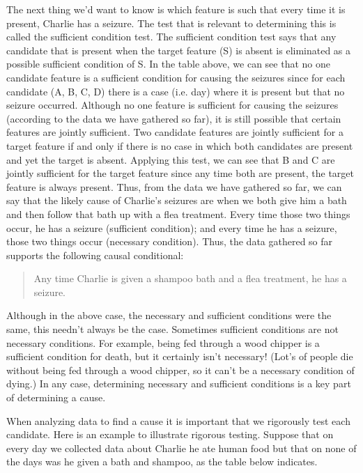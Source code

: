 The next thing we'd want to know is which feature is such that every time it is
present, Charlie has a seizure. The test that is relevant to determining this is
called the sufficient condition test. The sufficient condition test says that any
candidate that is present when the target feature (S) is absent is eliminated as a
possible sufficient condition of S. In the table above, we can see that no one
candidate feature is a sufficient condition for causing the seizures since for each
candidate (A, B, C, D) there is a case (i.e. day) where it is present but that no
seizure occurred. Although no one feature is sufficient for causing the seizures
(according to the data we have gathered so far), it is still possible that certain
features are jointly sufficient. Two candidate features are jointly sufficient for a
target feature if and only if there is no case in which both candidates are present
and yet the target is absent. Applying this test, we can see that B and C are
jointly sufficient for the target feature since any time both are present, the target
feature is always present. Thus, from the data we have gathered so far, we can
say that the likely cause of Charlie's seizures are when we both give him a bath
and then follow that bath up with a flea treatment. Every time those two things
occur, he has a seizure (sufficient condition); and every time he has a seizure,
those two things occur (necessary condition). Thus, the data gathered so far
supports the following causal conditional:

\begin{quote}Any time Charlie is given a shampoo bath and a flea treatment, he has a
seizure.
\end{quote}

Although in the above case, the necessary and sufficient conditions were the
same, this needn't always be the case. Sometimes sufficient conditions are not
necessary conditions. For example, being fed through a wood chipper is a
sufficient condition for death, but it certainly isn't necessary! (Lot's of people die
without being fed through a wood chipper, so it can't be a necessary condition
of dying.) In any case, determining necessary and sufficient conditions is a key
part of determining a cause.

When analyzing data to find a cause it is important that we rigorously test each
candidate. Here is an example to illustrate rigorous testing. Suppose that on
every day we collected data about Charlie he ate human food but that on none
of the days was he given a bath and shampoo, as the table below indicates.



